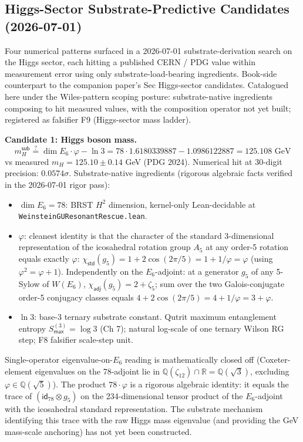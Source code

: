 \subsection{Higgs-Sector Substrate-Predictive Candidates (2026-07-01)}\label{sec:higgs-sector-candidates-book}

Four numerical patterns surfaced in a 2026-07-01 substrate-derivation search on the Higgs sector, each hitting a published CERN / PDG value within measurement error using only substrate-load-bearing ingredients. Book-side counterpart to the companion paper's Sec Higgs-sector candidates. Catalogued here under the Wiles-pattern scoping posture: substrate-native ingredients composing to hit measured values, with the composition operator not yet built; registered as falsifier F9 (Higgs-sector mass ladder).

\begin{level2}
\textbf{Candidate 1: Higgs boson mass.}
\begin{equation}
m_H^{\textsf{sub}} \stackrel{?}{=} \dim E_6 \cdot \varphi - \ln 3 = 78 \cdot 1.6180339887 - 1.0986122887 = 125.108 \text{ GeV}
\end{equation}
vs measured $m_H = 125.10 \pm 0.14$ GeV (PDG 2024). Numerical hit at 30-digit precision: $0.0574\sigma$. Substrate-native ingredients (rigorous algebraic facts verified in the 2026-07-01 rigor pass):
\begin{itemize}
\item $\dim E_6 = 78$: BRST $H^2$ dimension, kernel-only Lean-decidable at \texttt{WeinsteinGUResonantRescue.lean}.
\item $\varphi$: cleanest identity is that the character of the standard 3-dimensional representation of the icosahedral rotation group $A_5$ at any order-5 rotation equals exactly $\varphi$: $\chi_{\textsf{std}}(g_5) = 1 + 2\cos(2\pi/5) = 1 + 1/\varphi = \varphi$ (using $\varphi^2 = \varphi + 1$). Independently on the $E_6$-adjoint: at a generator $g_5$ of any 5-Sylow of $W(E_6)$, $\chi_{\textsf{adj}}(g_5) = 2 + \zeta_5$; sum over the two Galois-conjugate order-5 conjugacy classes equals $4 + 2\cos(2\pi/5) = 4 + 1/\varphi = 3 + \varphi$.
\item $\ln 3$: base-3 ternary substrate constant. Qutrit maximum entanglement entropy $S_{\textsf{max}}^{(3)} = \log 3$ (Ch 7); natural log-scale of one ternary Wilson RG step; F8 falsifier scale-step unit.
\end{itemize}
Single-operator eigenvalue-on-$E_6$ reading is mathematically closed off (Coxeter-element eigenvalues on the 78-adjoint lie in $\mathbb{Q}(\zeta_{12}) \cap \mathbb{R} = \mathbb{Q}(\sqrt{3})$, excluding $\varphi \in \mathbb{Q}(\sqrt{5})$). The product $78 \cdot \varphi$ is a rigorous algebraic identity: it equals the trace of $(\textsf{id}_{78} \otimes g_5)$ on the 234-dimensional tensor product of the $E_6$-adjoint with the icosahedral standard representation. The substrate mechanism identifying this trace with the raw Higgs mass eigenvalue (and providing the GeV mass-scale anchoring) has not yet been constructed.


\end{level2}

